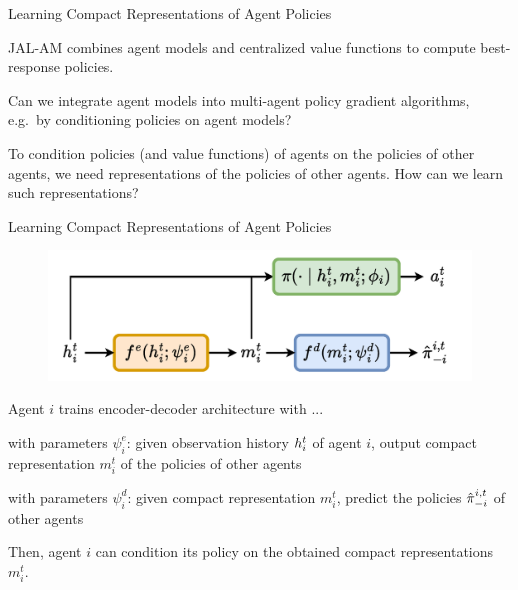 \begin{frame}[t]{Learning Compact Representations of Agent Policies}
    \blist
        \item JAL-AM combines agent models and centralized value functions to compute best-response policies.
        \item Can we integrate agent models into multi-agent policy gradient algorithms, e.g.\ by conditioning policies on agent models?
    \elist

    \pause

    \begin{problembox}
        To condition policies (and value functions) of agents on the policies of other agents, we need  representations of the policies of other agents. How can we learn such representations?
    \end{problembox}
\end{frame}

\begin{frame}[t]{Learning Compact Representations of Agent Policies}
    \begin{figure}
        \centering
        \includegraphics[width=.65\textwidth]{images/chapter_9/agent_modelling_encoder_decoder}
    \end{figure}

    Agent $i$ trains encoder-decoder architecture with ...
    \blist
        \item {} with parameters $\psi^e_i$: given observation history $h^t_i$ of agent $i$, output compact representation $m_i^t$ of the policies of other agents
        \item {} with parameters $\psi^d_i$: given compact representation $m_i^t$, predict the policies $\hat{\pi}_{-i}^{i,t}$ of other agents
    \elist

    \pause

    \vspace{-.5em}
    
    Then, agent $i$ can condition its policy on the obtained compact representations $m^t_i$.
\end{frame}

